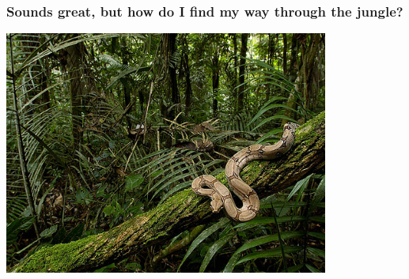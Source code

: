 \begin{frame}
    \frametitle{Sounds great, but how do I find my way through the
    jungle?}
    \begin{center}
        \includegraphics[width=0.8\textwidth]{jpg/jungle10.jpg}
    \end{center}
\end{frame}

